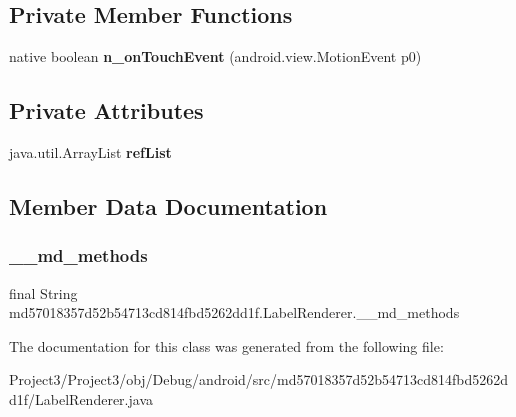 \subsection*{Private Member Functions}
\begin{DoxyCompactItemize}
\item 
\mbox{\label{classmd57018357d52b54713cd814fbd5262dd1f_1_1LabelRenderer_a30feb9b98a462c67f2a5295f8ab384cd}} 
native boolean {\bfseries n\+\_\+on\+Touch\+Event} (android.\+view.\+Motion\+Event p0)
\end{DoxyCompactItemize}
\subsection*{Private Attributes}
\begin{DoxyCompactItemize}
\item 
\mbox{\label{classmd57018357d52b54713cd814fbd5262dd1f_1_1LabelRenderer_a95ad3ee6fcc2a2fd40aee083882fac72}} 
java.\+util.\+Array\+List {\bfseries ref\+List}
\end{DoxyCompactItemize}


\subsection{Member Data Documentation}
\mbox{\label{classmd57018357d52b54713cd814fbd5262dd1f_1_1LabelRenderer_acbf8d2cb7c72ee5391f580882a66080f}} 
\subsubsection{\texorpdfstring{\+\_\+\+\_\+md\+\_\+methods}{\_\_md\_methods}}
{\footnotesize\ttfamily final String md57018357d52b54713cd814fbd5262dd1f.\+Label\+Renderer.\+\_\+\+\_\+md\+\_\+methods\hspace{0.3cm}{\ttfamily [static]}}



The documentation for this class was generated from the following file\+:\begin{DoxyCompactItemize}
\item 
Project3/\+Project3/obj/\+Debug/android/src/md57018357d52b54713cd814fbd5262dd1f/Label\+Renderer.\+java\end{DoxyCompactItemize}
